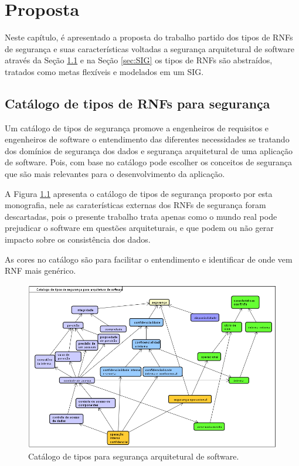 \chapter{Proposta}
\label{chap:proposta}

Neste capítulo, é apresentado a proposta do trabalho partido dos tipos de RNFs de segurança e suas características voltadas a segurança arquitetural de software através da Seção \ref{sec:CatalogoDeTiposDeNFRsParaSeguranca} e na Seção \ref{sec:SIG} os tipos de RNFs são abstraídos, tratados como metas flexíveis e modelados em um SIG.  

\section{Catálogo de tipos de RNFs para segurança}
\label{sec:CatalogoDeTiposDeNFRsParaSeguranca}

Um catálogo de tipos de segurança promove a engenheiros de requisitos e engenheiros de software o entendimento das diferentes necessidades se tratando dos domínios de segurança dos dados e segurança arquitetural de uma aplicação de software. Pois, com base no catálogo pode escolher os conceitos de segurança que são mais relevantes para o desenvolvimento da aplicação.

A Figura \ref{catalogoDeTipos} apresenta o catálogo de tipos de segurança proposto por esta monografia, nele as caraterísticas externas dos RNFs de segurança foram descartadas, pois o presente trabalho trata apenas como o mundo real pode prejudicar o software em questões arquiteturais, e que podem ou não gerar impacto sobre os consistência dos dados.    

As cores no catálogo são para facilitar o entendimento e identificar de onde vem RNF mais genérico. 

\begin{figure}[h!]
	\centering
	\includegraphics[keepaspectratio=true,scale=0.6]{figuras/catalogoDeTiposSeguranca.PNG}
	\caption{Catálogo de tipos para segurança arquitetural de software.}
	\label{catalogoDeTipos}
\end{figure}

